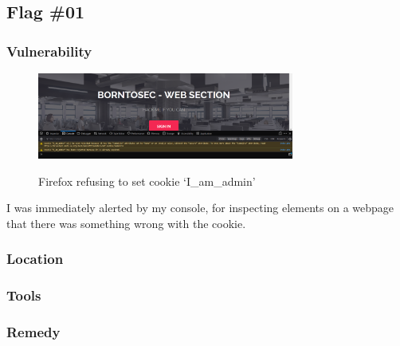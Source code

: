 \subsection{Flag \#01}

\subsubsection{Vulnerability}
\begin{figure}[!htb]
    \centering
    \includegraphics[width=0.752\textwidth]{3.cookies/01-01.png}\\[0cm]  
    \caption[Cookie Alert]{Firefox refusing to set cookie `I\_am\_admin'}
    \label{fig:03-01 - Firefox rejects cookie iamadmin} 
\end{figure}
I was immediately alerted by my console, for inspecting elements on
a webpage that there was something wrong with the cookie.
\subsubsection{Location}

\subsubsection{Tools}

    
    
\subsubsection{Remedy}